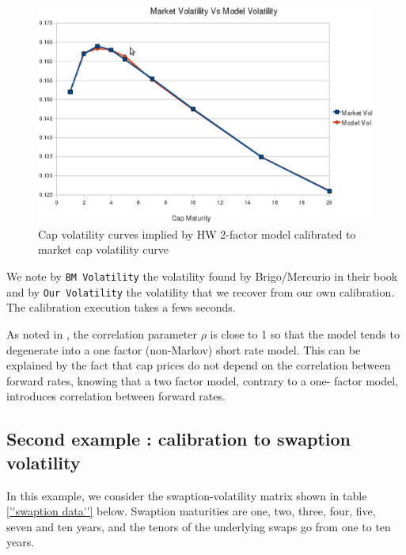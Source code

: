 \documentclass[12pt,a4paper]{article}
\begin{document}
\begin{figure}[h!]
 \centering
 \includegraphics[width=15cm,bb=0 0 791 510,keepaspectratio=true]{cap.eps}
 \caption{Cap volatility curves implied by HW 2-factor model calibrated to market cap volatility curve}
 \label{fig:cap_vol}
\end{figure}

We note by \texttt{BM Volatility} the volatility found by Brigo/Mercurio in their book and by \texttt{Our Volatility} the volatility that we recover from our own calibration. The calibration execution takes a fews seconds.

As noted in \cite{BM}, the correlation parameter $\rho$ is close to 1 so that the model tends to degenerate into a one factor (non-Markov) short rate model. This can be explained by the fact that cap prices do not depend on the correlation between forward rates, knowing that a two factor model, contrary to a one- factor model, introduces correlation between forward rates.

\subsection{Second example : calibration to swaption volatility}
In this example, we consider the swaption-volatility matrix shown in table \ref{''swaption data''} below. Swaption maturities are one, two, three, four, five, seven and ten years, and the tenors of the underlying swaps go from one to ten years.
\end{document}
